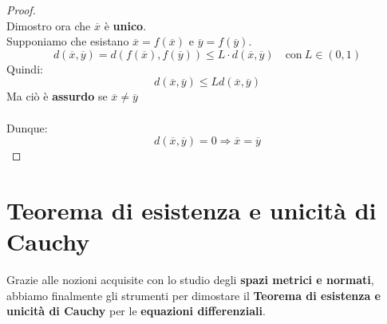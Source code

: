 \documentclass[a4paper, oneside]{article}
\newcommand\X{\mathbb{X}}
\begin{document}
\begin{theorem}
\begin{proof}
        \hfill\\
        \noindent Dimostro ora che $\overline{x}$ è \textbf{unico}.\\
        Supponiamo che esistano $\overline{x} = f(\overline{x})$ e $\overline{y} = f(\overline{y})$.
        \[d(\overline{x},\overline{y}) = d\left(f(\overline{x}),f(\overline{y})\right) \leq L\cdot d(\overline{x},\overline{y}) \quad\text{con} \ L\in(0,1)\]
        Quindi:
        \[d(\overline{x},\overline{y}) \leq L d(\overline{x},\overline{y})\]
        Ma ciò è \textbf{assurdo} se $\overline{x}\ne \overline{y}$\\\\
        Dunque:
        \[d(\overline{x},\overline{y}) = 0 \Rightarrow \overline{x} = \overline{y}\]
    \end{proof}
\end{theorem}

\newpage

\section{Teorema di esistenza e unicità di Cauchy}
Grazie alle nozioni acquisite con lo studio degli \textbf{spazi metrici e normati}, abbiamo finalmente gli strumenti
per dimostare il \textbf{Teorema di esistenza e unicità di Cauchy} per le \textbf{equazioni differenziali}.
\end{document}

